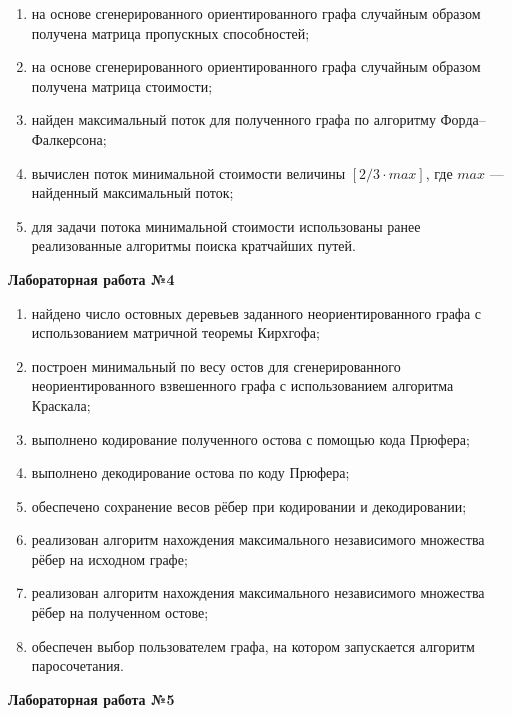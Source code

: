\documentclass[14pt,a4paper]{extarticle}
\begin{document}
\begin{enumerate}[start=17]
    \item на основе сгенерированного ориентированного графа случайным образом получена матрица пропускных способностей;
    \item на основе сгенерированного ориентированного графа случайным образом получена матрица стоимости;
    \item найден максимальный поток для полученного графа по алгоритму Форда--Фалкерсона;
    \item вычислен поток минимальной стоимости величины \([2/3 \cdot max]\), где \(max\) --- найденный максимальный поток;
    \item для задачи потока минимальной стоимости использованы ранее реализованные алгоритмы поиска кратчайших путей.
\end{enumerate}

\textbf{Лабораторная работа №4}

\begin{enumerate}[start=22]
    \item найдено число остовных деревьев заданного неориентированного графа с использованием матричной теоремы Кирхгофа;
    \item построен минимальный по весу остов для сгенерированного неориентированного взвешенного графа с использованием алгоритма Краскала;
    \item выполнено кодирование полученного остова с помощью кода Прюфера;
    \item выполнено декодирование остова по коду Прюфера;
    \item обеспечено сохранение весов рёбер при кодировании и декодировании;
    \item реализован алгоритм нахождения максимального независимого множества рёбер на исходном графе;
    \item реализован алгоритм нахождения максимального независимого множества рёбер на полученном остове;
    \item обеспечен выбор пользователем графа, на котором запускается алгоритм паросочетания.
\end{enumerate}

\textbf{Лабораторная работа №5}
\end{document}
